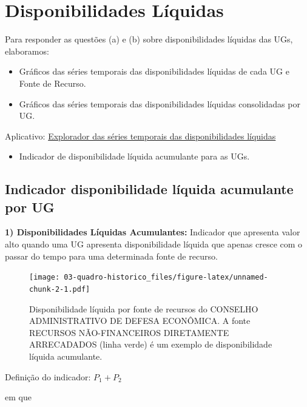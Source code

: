 \documentclass[]{book}
\providecommand{\tightlist}{%
  \setlength{\itemsep}{0pt}\setlength{\parskip}{0pt}}
\begin{document}
\hypertarget{disponibilidades-liquidas}{%
\section{Disponibilidades Líquidas}\label{disponibilidades-liquidas}}

Para responder as questões (a) e (b) sobre disponibilidades líquidas das UGs, elaboramos:

\begin{itemize}
\tightlist
\item
  Gráficos das séries temporais das disponibilidades líquidas de cada UG e Fonte de Recurso.
\item
  Gráficos das séries temporais das disponibilidades líquidas consolidadas por UG.
\end{itemize}

Aplicativo: \href{https://rseis.shinyapps.io/explorador_disponibilidades_liquidas}{Explorador das séries temporais das disponibilidades líquidas}

\begin{itemize}
\tightlist
\item
  Indicador de disponibilidade líquida acumulante para as UGs.
\end{itemize}

\hypertarget{indicador-disponibilidade-liquida-acumulante-por-ug}{%
\subsection{Indicador disponibilidade líquida acumulante por UG}\label{indicador-disponibilidade-liquida-acumulante-por-ug}}

\textbf{1) Disponibilidades Líquidas Acumulantes:} Indicador que apresenta valor alto quando uma UG apresenta disponibilidade líquida que apenas cresce com o passar do tempo para uma determinada fonte de recurso.

\begin{figure}
\centering
\texttt{[image: 03-quadro-historico\_files/figure-latex/unnamed-chunk-2-1.pdf]}
\caption{\label{fig:unnamed-chunk-2}Disponibilidade líquida por fonte de recursos do CONSELHO ADMINISTRATIVO DE DEFESA ECONÔMICA. A fonte RECURSOS NÃO-FINANCEIROS DIRETAMENTE ARRECADADOS (linha verde) é um exemplo de disponibilidade líquida acumulante.}
\end{figure}

Definição do indicador: \(P_1 + P_2\)

em que
\end{document}
